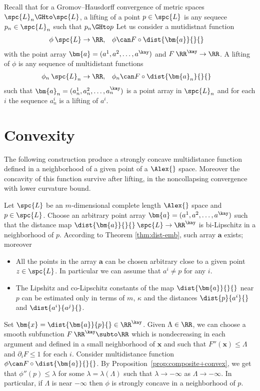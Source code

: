 Recall that for a Gromov--Hausdorff convergence of metric spaces
$\spc{L}_n\GHto\spc{L}$,
a lifting of a point $p\in \spc{L}$ is any sequece $p_n\in\spc{L}_n$ such that $p_n\GHto p$
Let us consider a mutidistnat function 
\begin{align*}
\phi&\:\spc{L}\to\RR,
&
\phi&\can F\circ\dist{\bm{a}}{}{}
\end{align*}
with the point array $\bm{a}=(a^1,a^2,\dots,a^\kay)$ and $F\:\RR^\kay\to \RR$.
A lifting of $\phi$ is any sequence of multidistant 
functions 
 \begin{align*}
\phi_n
&\:\spc{L}_n\to\RR,
&
\phi_n
&\can F\circ\dist{\bm{a}_n}{}{}
\end{align*}
such that $\bm{a}_n=(a_n^1,a_n^2,\dots,a_n^\kay)$
is a point array in $\spc{L}_n$
and for each $i$ the sequence $a_n^i$ is a lifting of $a^i$.



\section{Convexity}

The following construction produce 
a strongly concave multidistance function
defined in a neighborhood of a given point 
of a $\Alex{}$ space.
Moreover the concavity of this function survive 
after lifting, in the noncollapsing convergence 
with lower curvature bound.

Let $\spc{L}$ be an $m$-dimensional complete length $\Alex{}$ space and $p\in\spc{L}$.
Choose an arbitrary point array 
$\bm{a}=(a^1,a^2,\dots,a^\kay)$
such that the distance map $\dist{\bm{a}}{}{}\:\spc{L}\to\RR^\kay$ is bi-Lipschitz in a neighborhood of $p$.
According to  Theorem \ref{thm:dist-emb},
such array $\bm{a}$ exists; 
moreover 
\begin{itemize}
\item All the points in the array $\bm{a}$ can be chosen arbitrary close to a given point $z\in \spc{L}$. In particular we can assume that $a^i\ne p$ for any $i$.
\item The Lipshitz and co-Lipschitz constants of the map $\dist{\bm{a}}{}{}$ near $p$ can be estimated only in terms of $m$, $\kappa$ and the distances $\dist{p}{a^i}{}$ and $\dist{a^i}{a^j}{}$. 
\end{itemize}

Set $\bm{x}=\dist{\bm{a}}{p}{}\in\RR^\kay$.
Given $\Lambda\in\RR$,
we can choose a smooth subfunction $F\:\RR^\kay\subto\RR$
which is nondecreasing in each argument
and defined in a small neighborhood of $\bm{x}$
and such that $F''(\bm{x})\le \Lambda$ and $\partial_iF\le 1$ for each $i$.
Consider multidistance function $\phi\can F\circ\dist{\bm{a}}{}{}$.
By Proposition~\ref{prop:composite+convex},
we get that $\phi''(p)\le \lambda$
for some $\lambda=\lambda(\Lambda)$ such that
$\lambda\to-\infty$ as $\Lambda\to-\infty$.
In particular, if $\Lambda$ is near $-\infty$
then $\phi$ is strongly concave 
in a neighborhood of $p$.

